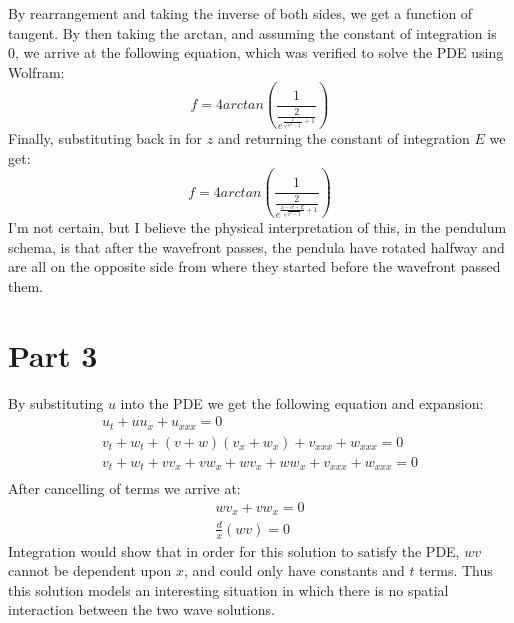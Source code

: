 \documentclass{article}
\begin{document}
By rearrangement and taking the inverse of both sides, we get a function of tangent. By then taking the arctan, and assuming the constant of integration is 0, we arrive at the following equation, which was verified to solve the PDE using Wolfram:
\begin{equation}
f = 4arctan(\frac{1}{\frac{2}{e^{\frac{z}{\sqrt{c^2-1}}+1}}})
\end{equation}
Finally, substituting back in for $z$ and returning the constant of integration $E$ we get:
\begin{equation}
f = 4arctan(\frac{1}{\frac{2}{e^{\frac{x-ct + E}{\sqrt{c^2-1}}+1}}})
\end{equation}
I'm not certain, but I believe the physical interpretation of this, in the pendulum schema, is that after the wavefront passes, the pendula have rotated halfway and are all on the opposite side from where they started before the wavefront passed them.
\section*{Part 3}
By substituting $u$ into the PDE we get the following equation and expansion:
\begin{equation}
\begin{aligned}
u_t +uu_x + u_{xxx} = 0\\
v_t + w_t + (v + w)(v_x + w_x) + v_{xxx} + w_{xxx} = 0\\
v_t + w_t + vv_x + vw_x + wv_x +ww_x + v_{xxx} + w_{xxx} = 0\\
\end{aligned}
\end{equation}
After cancelling of terms we arrive at:
\begin{equation}
\begin{aligned}
wv_x + vw_x = 0\\
\frac{d}{x}(wv) = 0
\end{aligned}
\end{equation}
Integration would show that in order for this solution to satisfy the PDE, $wv$ cannot be dependent upon $x$, and could only have constants and $t$ terms. Thus this solution models an interesting situation in which there is no spatial interaction between the two wave solutions.
\end{document}
